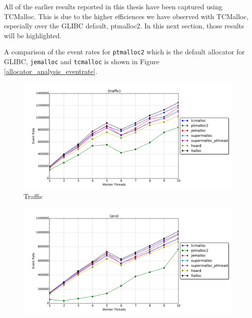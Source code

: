 \documentclass[11pt]{book}
\begin{document}
All of the earlier results reported in this thesis have been captured using TCMalloc.  This is due
to the higher efficiences we have observed with TCMalloc, especially over the GLIBC default, ptmalloc2.
In this next section, those results will be highlighted.

A comparison of the event rates for \texttt{ptmalloc2} which is the default allocator for GLIBC,
\texttt{jemalloc} and \texttt{tcmalloc} is shown in Figure \ref{allocator_analysis_eventrate}.

\begin{figure}
  \begin{minipage}{.5\textwidth}
    \begin{center}
      \includegraphics[width=\textwidth,keepaspectratio,quiet]{figs/memory_allocation/traffic_eventrate.pdf} \\
      Traffic \\
    \end{center}
  \end{minipage}%
  \hfill
  \begin{minipage}{.5\textwidth}
    \begin{center}
      \includegraphics[width=\textwidth,keepaspectratio,quiet]{figs/memory_allocation/pcs_eventrate.pdf} \\

\end{center}
\end{minipage}
\end{figure}
\end{document}
